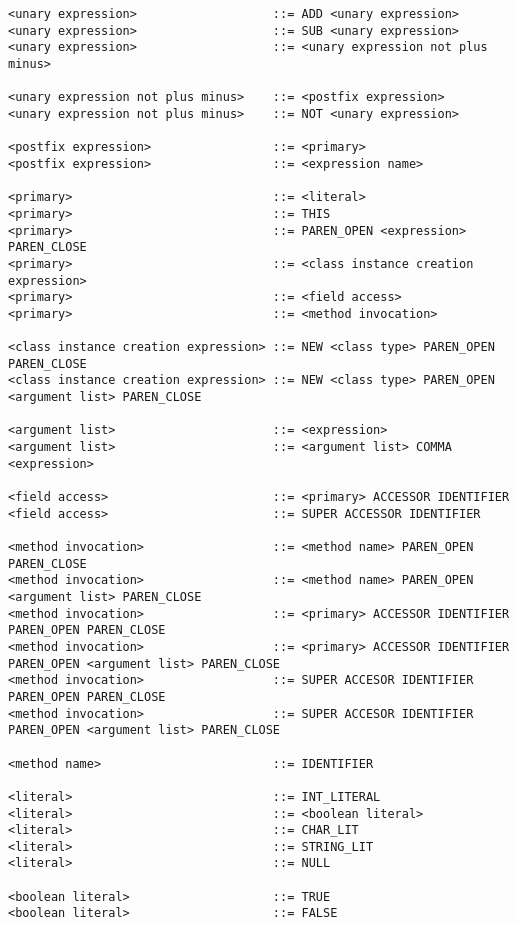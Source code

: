 \begin{lstlisting}
<unary expression>                   ::= ADD <unary expression>
<unary expression>                   ::= SUB <unary expression>
<unary expression>                   ::= <unary expression not plus minus>

<unary expression not plus minus>    ::= <postfix expression>
<unary expression not plus minus>    ::= NOT <unary expression>

<postfix expression>                 ::= <primary>
<postfix expression>                 ::= <expression name>

<primary>                            ::= <literal>
<primary>                            ::= THIS
<primary>                            ::= PAREN_OPEN <expression> PAREN_CLOSE
<primary>                            ::= <class instance creation expression>
<primary>                            ::= <field access>
<primary>                            ::= <method invocation>

<class instance creation expression> ::= NEW <class type> PAREN_OPEN PAREN_CLOSE
<class instance creation expression> ::= NEW <class type> PAREN_OPEN <argument list> PAREN_CLOSE

<argument list>                      ::= <expression>
<argument list>                      ::= <argument list> COMMA <expression>

<field access>                       ::= <primary> ACCESSOR IDENTIFIER
<field access>                       ::= SUPER ACCESSOR IDENTIFIER

<method invocation>                  ::= <method name> PAREN_OPEN PAREN_CLOSE
<method invocation>                  ::= <method name> PAREN_OPEN <argument list> PAREN_CLOSE
<method invocation>                  ::= <primary> ACCESSOR IDENTIFIER PAREN_OPEN PAREN_CLOSE
<method invocation>                  ::= <primary> ACCESSOR IDENTIFIER PAREN_OPEN <argument list> PAREN_CLOSE
<method invocation>                  ::= SUPER ACCESOR IDENTIFIER PAREN_OPEN PAREN_CLOSE
<method invocation>                  ::= SUPER ACCESOR IDENTIFIER PAREN_OPEN <argument list> PAREN_CLOSE

<method name>                        ::= IDENTIFIER

<literal>                            ::= INT_LITERAL
<literal>                            ::= <boolean literal>
<literal>                            ::= CHAR_LIT
<literal>                            ::= STRING_LIT
<literal>                            ::= NULL

<boolean literal>                    ::= TRUE
<boolean literal>                    ::= FALSE
\end{lstlisting}

